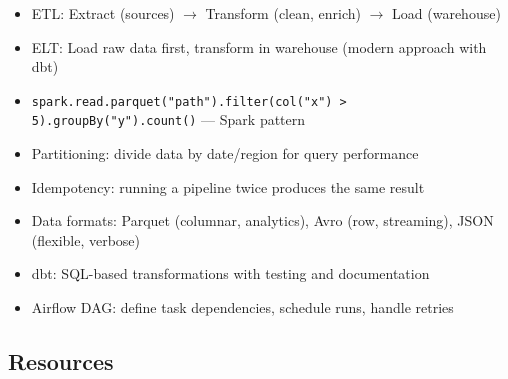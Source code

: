 \documentclass[11pt, a4paper, oneside]{report}
\begin{document}
\begin{cheatsheetbox}
\begin{itemize}[leftmargin=*]
\item ETL: Extract (sources) $\to$ Transform (clean, enrich) $\to$ Load (warehouse)
\item ELT: Load raw data first, transform in warehouse (modern approach with dbt)
\item \texttt{spark.read.parquet("path").filter(col("x") > 5).groupBy("y").count()} --- Spark pattern
\item Partitioning: divide data by date/region for query performance
\item Idempotency: running a pipeline twice produces the same result
\item Data formats: Parquet (columnar, analytics), Avro (row, streaming), JSON (flexible, verbose)
\item dbt: SQL-based transformations with testing and documentation
\item Airflow DAG: define task dependencies, schedule runs, handle retries
\end{itemize}
\end{cheatsheetbox}

\subsection*{Resources}
\end{document}
